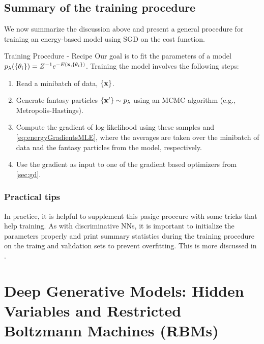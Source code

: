 \subsection{Summary of the training procedure}
\label{subsec:energyTrainingProcedure}
We now summarize the discussion above and present a general procedure for training an energy-based model using SGD on the cost function.
\begin{mybox}{Training Procedure - Recipe}
	Our goal is to fit the parameters of a model $p_{\lambda}(\{\theta_i\}) = Z^{-1} e^{-E(\mathbf{x},\{\theta_i\})}$. Training the model involves the following steps:
		\begin{enumerate}
			\item Read a minibatch of data, $\{\mathbf{x}\}$.
			\item Generate fantasy particles $\{\mathbf{x}^\prime\} \sim p_\lambda$ using an MCMC algorithm (e.g., Metropolis-Hastings).
			\item Compute the gradient of log-likelihood using these samples and \ref{eq:energyGradientsMLE}, where the averages are taken over the minibatch of data nad the fantasy particles from the model, respectively.
			\item Use the gradient as input to one of the gradient based optimizers from \ref{sec:gd}.
		\end{enumerate}
\end{mybox}
\subsubsection{Practical tips}
In practice, it is helpful to supplement this pasigc proecure with some tricks that help training. As with discriminative NNs, it is important to initialize the parameters properly and print summary statistics during the training procedure on the traing and validation sets to prevent overfitting. This is more discussed in .











\section{Deep Generative Models: Hidden Variables and Restricted Boltzmann Machines (RBMs)}
\label{sec:deepGenerative}




















 